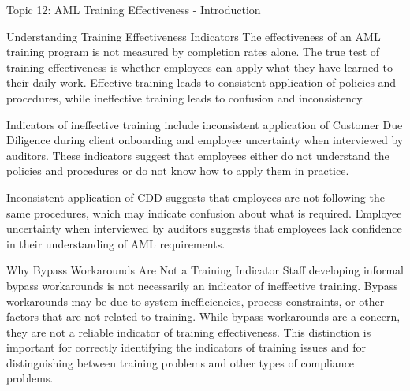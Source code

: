 \documentclass[8pt]{beamer}  %
\begin{document}
	\begin{frame}{Topic 12: AML Training Effectiveness - Introduction}
		\begin{block}{\large Understanding Training Effectiveness Indicators}
			The effectiveness of an AML training program is not measured by completion rates alone. The true test of training effectiveness is whether employees can apply what they have learned to their daily work. Effective training leads to consistent application of policies and procedures, while ineffective training leads to confusion and inconsistency.
			
			Indicators of ineffective training include inconsistent application of Customer Due Diligence during client onboarding and employee uncertainty when interviewed by auditors. These indicators suggest that employees either do not understand the policies and procedures or do not know how to apply them in practice.
			
			Inconsistent application of CDD suggests that employees are not following the same procedures, which may indicate confusion about what is required. Employee uncertainty when interviewed by auditors suggests that employees lack confidence in their understanding of AML requirements.
		\end{block}
		
		\vspace{0.2cm}
		\begin{block}{\large Why Bypass Workarounds Are Not a Training Indicator}
			Staff developing informal bypass workarounds is not necessarily an indicator of ineffective training. Bypass workarounds may be due to system inefficiencies, process constraints, or other factors that are not related to training. While bypass workarounds are a concern, they are not a reliable indicator of training effectiveness. This distinction is important for correctly identifying the indicators of training issues and for distinguishing between training problems and other types of compliance problems.
		\end{block}
	\end{frame}
	
\end{document}
